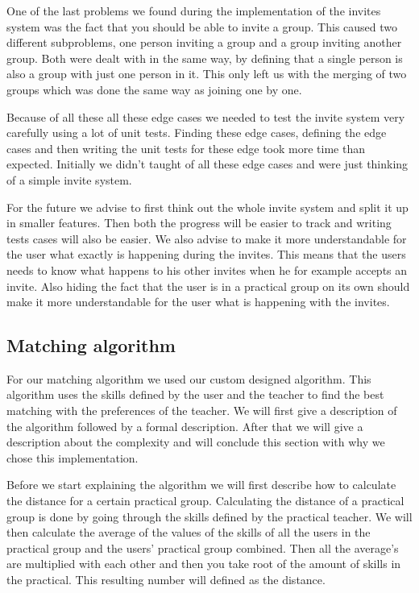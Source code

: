 One of the last problems we found during the implementation of the invites system was the fact that you should be able to invite a group.
This caused two different subproblems, one person inviting a group and a group inviting another group.
Both were dealt with in the same way, by defining that a single person is also a group with just one person in it.
This only left us with the merging of two groups which was done the same way as joining one by one.

Because of all these all these edge cases we needed to test the invite system very carefully using a lot of unit tests.
Finding these edge cases, defining the edge cases and then writing the unit tests for these edge took more time than expected.
Initially we didn't taught of all these edge cases and were just thinking of a simple invite system.

For the future we advise to first think out the whole invite system and split it up in smaller features.
Then both the progress will be easier to track and writing tests cases will also be easier.
We also advise to make it more understandable for the user what exactly is happening during the invites.
This means that the users needs to know what happens to his other invites when he for example accepts an invite.
Also hiding the fact that the user is in a practical group on its own should make it more understandable for the user what is happening with the invites.

\subsection{Matching algorithm}
\label{sec:algorithm}
For our matching algorithm we used our custom designed algorithm.
This algorithm uses the skills defined by the user and the teacher to find the best matching with the preferences of the teacher.
We will first give a description of the algorithm followed by a formal description.
After that we will give a description about the complexity and will conclude this section with why we chose this implementation.

Before we start explaining the algorithm we will first describe how to calculate the distance for a certain practical group.
Calculating the distance of a practical group is done by going through the skills defined by the practical teacher.
We will then calculate the average of the values of the skills of all the users in the practical group and the users' practical group combined.
Then all the average's are multiplied with each other and then you take root of the amount of skills in the practical.
This resulting number will defined as the distance.

